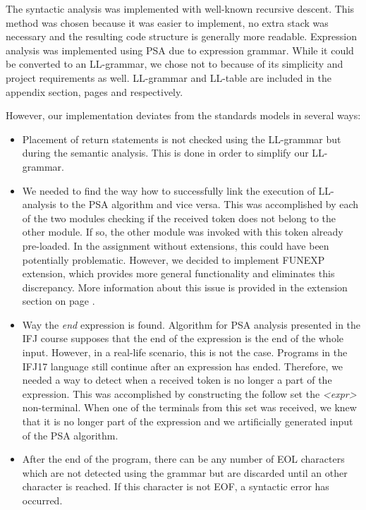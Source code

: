 \documentclass[a4paper, 11pt]{article}
\begin{document}
The syntactic analysis was implemented with well-known recursive descent. This method was chosen because it was easier to implement, no extra stack was necessary and the resulting code structure is generally more readable. Expression analysis was implemented using PSA due to expression grammar. While it could be converted to an LL-grammar, we chose not to because of its simplicity and project requirements as well. LL-grammar and LL-table are included in the appendix section, pages \pageref{fig:ll_grammar} and \pageref{fig:ll_table} respectively.

However, our implementation deviates from the standards models in several ways:
\begin{itemize}
\item Placement of return statements is not checked using the LL-grammar but during the semantic analysis. This is done in order to simplify our LL-grammar.
\item We needed to find the way how to successfully link the execution of LL-analysis to the PSA algorithm and vice versa. This was accomplished by each of the two modules checking if the received token does not belong to the other module. If so, the other module was invoked with this token already pre-loaded. In the assignment without extensions, this could have been potentially problematic. However, we decided to implement FUNEXP extension, which provides more general functionality and eliminates this discrepancy. More information about this issue is provided in the extension section on page \pageref{sec:extensions}.
\item Way the \emph{end} expression is found. Algorithm for PSA analysis presented in the IFJ course supposes that the end of the expression is the end of the whole input. However, in a real-life scenario, this is not the case. Programs in the IFJ17 language still continue after an expression has ended. Therefore, we needed a way to detect when a received token is no longer a part of the expression. This was accomplished by constructing the follow set the \emph{<expr>} non-terminal. When one of the terminals from this set was received, we knew that it is no longer part of the expression and we artificially generated input of the PSA algorithm.
\item After the end of the program, there can be any number of EOL characters which are not detected using the grammar but are discarded until an other character is reached. If this character is not EOF, a syntactic error has occurred.
\end{itemize}
\end{document}
